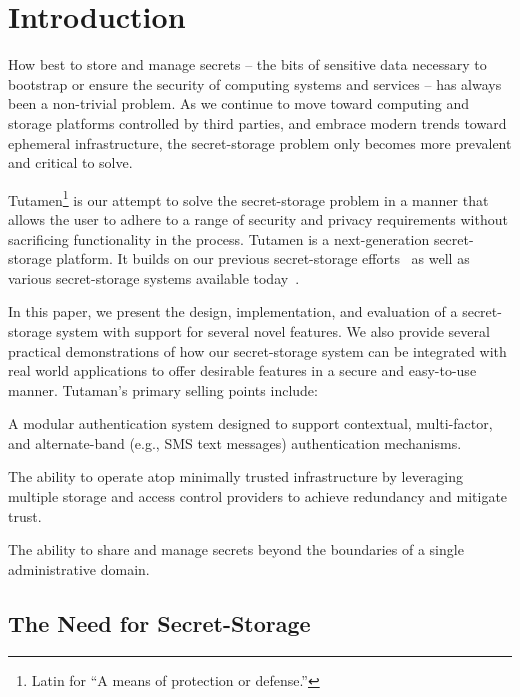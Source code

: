 \section{Introduction}
\label{sec:intro}

How best to store and manage secrets -- the bits of sensitive data
necessary to bootstrap or ensure the security of computing systems and
services -- has always been a non-trivial problem. As we continue to
move toward computing and storage platforms controlled by third
parties, and embrace modern trends toward ephemeral infrastructure,
the secret-storage problem only becomes more prevalent and critical to
solve.

Tutamen\footnote{Latin for ``A means of protection or defense.''} is
our attempt to solve the secret-storage problem in a manner that
allows the user to adhere to a range of security and privacy
requirements without sacrificing functionality in the process. Tutamen
is a next-generation secret-storage platform. It builds on our
previous secret-storage efforts~\cite{custos-trios} as well as various
secret-storage systems available today~\cite{vault, confidant,
  keywhiz}.

In this paper, we present the design, implementation, and evaluation
of a secret-storage system with support for several novel features. We
also provide several practical demonstrations of how our
secret-storage system can be integrated with real world applications
to offer desirable features in a secure and easy-to-use
manner. Tutaman's primary selling points include:
\begin{packed_item}
\item A modular authentication system designed to support contextual,
  multi-factor, and alternate-band (e.g., SMS text messages)
  authentication mechanisms.
\item The ability to operate atop minimally trusted infrastructure by
  leveraging multiple storage and access control providers to achieve
  redundancy and mitigate trust.
\item The ability to share and manage secrets beyond the boundaries
  of a single administrative domain.
\end{packed_item}

\subsection{The Need for Secret-Storage}

